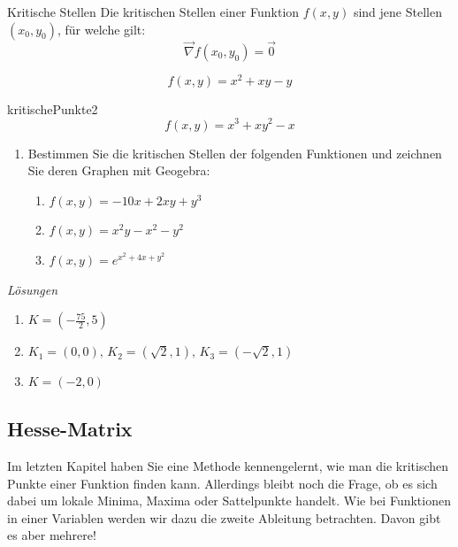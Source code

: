 \begin{definition}
	{Kritische Stellen}{}
	Die kritischen Stellen einer Funktion \(f(x, y)\) sind jene Stellen \((x_0, y_0)\), für welche gilt:
	\[
		\vec{\nabla} f(x_0, y_0) = \vec{0}
	\]
\end{definition}

\begin{bsp}
	{}{}
	$$f(x,y)=x^2+xy-y$$
	\vspace*{8cm}
\end{bsp}
\clearpage
\begin{bsp}
	{}{kritischePunkte2}
	$$f(x,y)=x^3+xy^2-x$$
	\vspace*{15cm}
\end{bsp}

\begin{ueb}
	{}{}
	\begin{enumerate}
		\item Bestimmen Sie die kritischen Stellen der folgenden Funktionen und zeichnen Sie deren Graphen mit Geogebra:
		      \begin{enumerate}
			      \item \(f(x,y) = -10x + 2xy + y^3\)
			      \item \(f(x,y) = x^2y - x^2 - y^2\)
			      \item \(f(x,y) = e^{x^2 + 4x + y^2}\)
		      \end{enumerate}
	\end{enumerate}
\end{ueb}

\clearpage
\emph{Lösungen}
\begin{enumerate}
	\item \(K = \left(-\frac{75}{2}, 5\right)\)
	\item \(K_1 = (0, 0), \, K_2 = \left(\sqrt{2}, 1\right), \, K_3 = \left(-\sqrt{2}, 1\right)\)
	\item \(K = (-2, 0)\)
\end{enumerate}

















\clearpage
\subsection{Hesse-Matrix}
\label{sec:hesseMatrix}
Im letzten Kapitel haben Sie eine Methode kennengelernt, wie man die kritischen Punkte einer Funktion finden kann. Allerdings bleibt noch die Frage, ob es sich dabei um lokale Minima, Maxima oder Sattelpunkte handelt. Wie bei Funktionen in einer Variablen werden wir dazu die zweite Ableitung betrachten. Davon gibt es aber mehrere!

